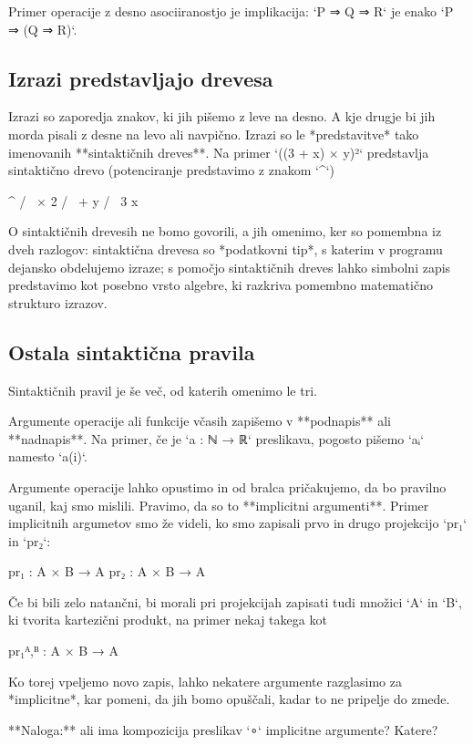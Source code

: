 Primer operacije z desno asociiranostjo je implikacija: `P ⇒ Q ⇒ R` je enako `P ⇒ (Q ⇒ R)`.


\subsection{Izrazi predstavljajo drevesa}

Izrazi so zaporedja znakov, ki jih pišemo z leve na desno. A kje drugje bi jih morda pisali z desne na levo ali
navpično. Izrazi so le *predstavitve* tako imenovanih **sintaktičnih dreves**. Na primer `((3 + x) × y)²` predstavlja
sintaktično drevo (potenciranje predstavimo z znakom `^`)

           ^
          / \
         ×   2
        / \
       +   y
      / \
     3   x

O sintaktičnih drevesih ne bomo govorili, a jih omenimo, ker so pomembna iz dveh razlogov: sintaktična drevesa so
*podatkovni tip*, s katerim v programu dejansko obdelujemo izraze; s pomočjo sintaktičnih dreves lahko simbolni zapis
predstavimo kot posebno vrsto algebre, ki razkriva pomembno matematično strukturo izrazov.


\subsection{Ostala sintaktična pravila}

Sintaktičnih pravil je še več, od katerih omenimo le tri.

Argumente operacije ali funkcije včasih zapišemo v **podnapis** ali **nadnapis**. Na primer, če je `a : ℕ → ℝ`
preslikava, pogosto pišemo `aᵢ` namesto `a(i)`.

Argumente operacije lahko opustimo in od bralca pričakujemo, da bo pravilno uganil, kaj smo mislili. Pravimo, da so to
**implicitni argumenti**. Primer implicitnih argumetov smo že videli, ko smo zapisali prvo in drugo projekcijo `pr₁` in
`pr₂`:

    pr₁ : A × B → A
    pr₂ : A × B → A

Če bi bili zelo natančni, bi morali pri projekcijah zapisati tudi množici `A` in `B`, ki tvorita kartezični produkt, na
primer nekaj takega kot

    pr₁ᴬ,ᴮ : A × B → A

Ko torej vpeljemo novo zapis, lahko nekatere argumente razglasimo za *implicitne*, kar pomeni, da jih bomo opuščali,
kadar to ne pripelje do zmede.

**Naloga:** ali ima kompozicija preslikav `∘` implicitne argumente? Katere?

